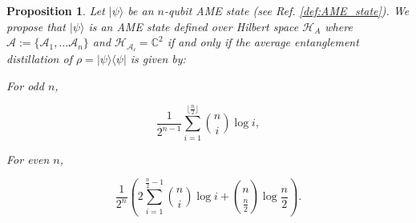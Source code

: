 \documentclass{article}
\newtheorem{prop}[theorem]{Proposition}
\newcommand{\ket}[1]{|#1\rangle}
\newcommand{\ketbra}[2]{| #1\rangle\! \langle #2|}
\begin{document}
\begin{prop}
\label{prop:ADE_iff_AME}
Let $\ket{\psi}$ be an $n$-qubit AME state (see Ref. \ref{def:AME_state}). We propose that $\ket{\psi}$ is an AME state defined over Hilbert space $\mathcal{H}_A$ where $\mathcal{A} := \{\mathcal{A}_1, \ldots \mathcal{A}_n\}$ and $\mathcal{H_{\mathcal{A_i}}} = \mathbb{C}^2$  if and only if the average entanglement distillation of $\rho = \ketbra{\psi}{\psi}$ is given by:

 For odd $n$, 

\begin{equation}
\frac{1}{2^{n-1}} \sum_{i=1}^{\lfloor \frac{n}{2} \rfloor} \binom{n}{i} \log i,
\end{equation}


For even $n$, 

\begin{equation}
\frac{1}{2^n} \left( 2 \sum_{i=1}^{\frac{n}{2} - 1} \binom{n}{i}\log i + \binom{n}{\frac{n}{2}}  \log  \frac{n}{2}  \right).
\end{equation}

\end{prop}
\end{document}
